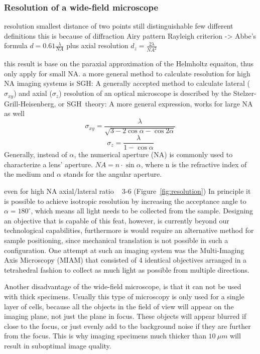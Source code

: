 \documentclass{diploma_style}
\begin{document}
\subsubsection{Resolution of a wide-field microscope}

resolution
smallest distance of two points still distinguishable
few different definitions
this is because of diffraction
Airy pattern
Rayleigh criterion -> Abbe's formula
$d = 0.61 \frac{\lambda}{NA}$
plus axial resolution
$d_z = \frac{2\lambda}{NA^2}$

this result is base on the paraxial approximation of the Helmholtz equaiton, thus only apply for small NA.
a more general method to calculate resolution for high NA imaging systems is SGH:
A generally accepted method to calculate lateral ($\sigma_{xy}$) and axial ($\sigma_{z}$) resolution of an optical microscope is described by the Stelzer-Grill-Heisenberg, or SGH~theory\cite{grill_method_1999, stelzer_uncertainty_2000}:
A more general expression, works for large NA as well
\begin{equation} \label{eq:latres}
\sigma_{xy}=\frac{\lambda}{\sqrt{3-2 \cos \alpha - \cos 2 \alpha}}
\end{equation}
\begin{equation} \label{eq:axres}
\sigma_z = \frac{\lambda}{1-\cos \alpha}
\end{equation}
Generally, instead of $\alpha$, the numerical aperture (NA) is commonly used to characterize a lens' aperture. 
$NA=n\cdot \sin \alpha$, where n is the refractive index of the medium and $\alpha$ stands for the angular aperture.

even for high NA axial/lateral ratio ~ 3-6 (Figure~\ref{fig:resolution})
In principle it is possible to achieve isotropic resolution by increasing the acceptance angle to $\alpha = 180^\circ$, which means all light needs to be collected from the sample. Designing an objective that is capable of this feat, however, is currently beyond our technological capabilities, furthermore is would require an alternative method for sample positioning, since mechanical translation is not possible in such a configuration. One attempt at such an imaging system was the Multi-Imaging Axis Microscopy (MIAM) \cite{swoger_multiple_2003,swoger_multi-view_2007} that consisted of 4 identical objectives arranged in a tetrahedral fashion to collect as much light as possible from multiple directions. 

Another disadvantage of the wide-field microscope, is that it can not be used with thick specimens. Usually this type of microscopy is only used for a single layer of cells, because all the objects in the field of view will appear on the imaging plane, not just the plane in focus. These objects will appear blurred if close to the focus, or just evenly add to the background noise if they are further from the focus. This is why imaging specimens much thicker than $10\ \mu m$ will result in suboptimal image quality.
\end{document}
